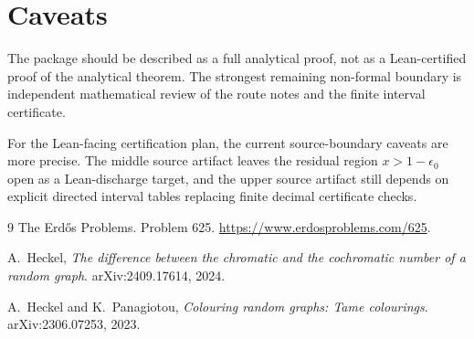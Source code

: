 \documentclass[11pt,a4paper]{article}
\begin{document}
\section{Caveats}

The package should be described as a full analytical proof, not as a
Lean-certified proof of the analytical theorem.  The strongest remaining
non-formal boundary is independent mathematical review of the route notes
and the finite interval certificate.

For the Lean-facing certification plan, the current source-boundary caveats
are more precise.  The middle source artifact leaves the residual region $x>1-\epsilon_0$ open as a Lean-discharge target, and the upper source
artifact still depends on explicit directed interval tables replacing finite decimal certificate checks.

\begin{thebibliography}{9}
The Erd\H{o}s Problems. Problem 625.\newline
\url{https://www.erdosproblems.com/625}.

A.~Heckel,
\textit{The difference between the chromatic and the cochromatic number of a random graph}.
arXiv:2409.17614, 2024.

A.~Heckel and K.~Panagiotou,
\textit{Colouring random graphs: Tame colourings}.
arXiv:2306.07253, 2023.
\end{thebibliography}
\end{document}
